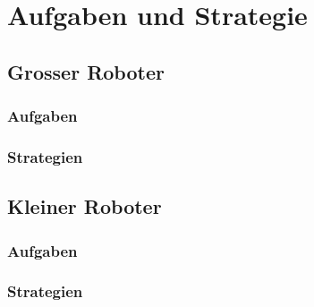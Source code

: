 \section{Aufgaben und Strategie}
\subsection{Grosser Roboter}

\begin{frame}
	\frametitle{Aufgaben}
	
\end{frame}

\begin{frame}
	\frametitle{Strategien}
	
\end{frame}

\subsection{Kleiner Roboter}

\begin{frame}
	\frametitle{Aufgaben}
	
\end{frame}

\begin{frame}
	\frametitle{Strategien}
	
\end{frame}

